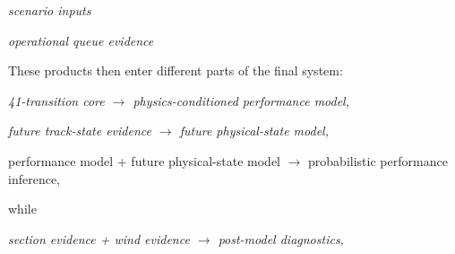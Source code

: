 \begin{center}\textit{}\end{center}

\begin{center}\textit{}\end{center}

\begin{center}\textit{scenario inputs}\end{center}

\begin{center}\textit{}\end{center}

\begin{center}\textit{}\end{center}

\begin{center}\textit{}\end{center}

\begin{center}\textit{}\end{center}

\begin{center}\textit{operational queue evidence}\end{center}

\begin{center}\textit{}\end{center}

\begin{center}\textit{}\end{center}

These products then enter different parts of the final system:

\begin{center}\textit{41-transition core \ensuremath{\rightarrow} physics-conditioned performance model,}\end{center}

\begin{center}\textit{future track-state evidence \ensuremath{\rightarrow} future physical-state model,}\end{center}

performance model + future physical-state model \ensuremath{\rightarrow} probabilistic performance inference,

while

\begin{center}\textit{section evidence + wind evidence \ensuremath{\rightarrow} post-model diagnostics,}\end{center}

